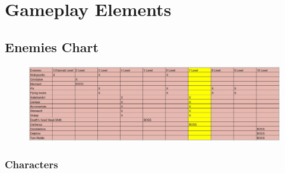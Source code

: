 \section{Gameplay Elements}





\subsection{Enemies Chart}
\begin{figure}[H]
\includegraphics[max width=\textwidth]{../Pictures/Gameplay/Enemies_chart.jpg}
\end{figure}


\pagebreak

\subsubsection{Characters}
